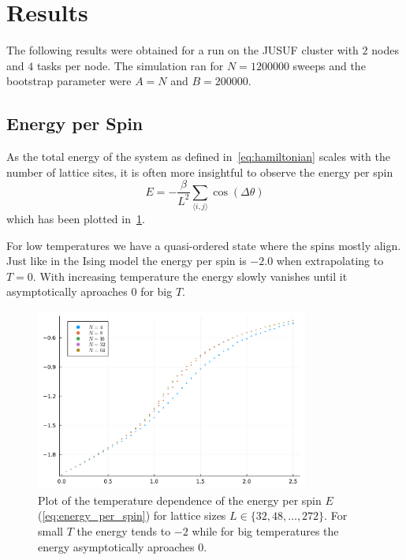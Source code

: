 \section{Results}
The following results were obtained for a run on the JUSUF cluster with $2$ nodes and $4$ tasks per node. The simulation ran for $N = \num{1 200 000}$ sweeps and the bootstrap parameter were $A = N$ and $B = \num{200 000}$.

\subsection{Energy per Spin}
As the total energy of the system as defined in~\cref{eq:hamiltonian} scales with the number of lattice sites, it is often more insightful to observe the energy per spin
\begin{equation}\label{eq:energy_per_spin}
	E = - \frac{\beta}{L^2} \sum_{\langle i,j \rangle}{\cos{(\Delta \theta)}}
\end{equation}
which has been plotted in~\cref{fig:energy_per_spin}.

For low temperatures we have a quasi-ordered state where the spins mostly align. Just like in the Ising model the energy per spin is $-2.0$ when extrapolating to $T=0$. With increasing temperature the energy slowly vanishes until it asymptotically aproaches $0$ for big $T$.
\begin{figure}[hbt!]
	\centering
	\includegraphics[width=0.8\textwidth]{Energy.pdf}
	\caption[Temperature dependence of the energy per spin $E$]{Plot of the temperature dependence of the energy per spin $E$ (\cref{eq:energy_per_spin}) for lattice sizes $L\in\{32, 48, \dots, 272\}$. For small $T$ the energy tends to $\num{-2}$ while for big temperatures the energy asymptotically aproaches $\num{0}$.}
	\label{fig:energy_per_spin}
\end{figure}

